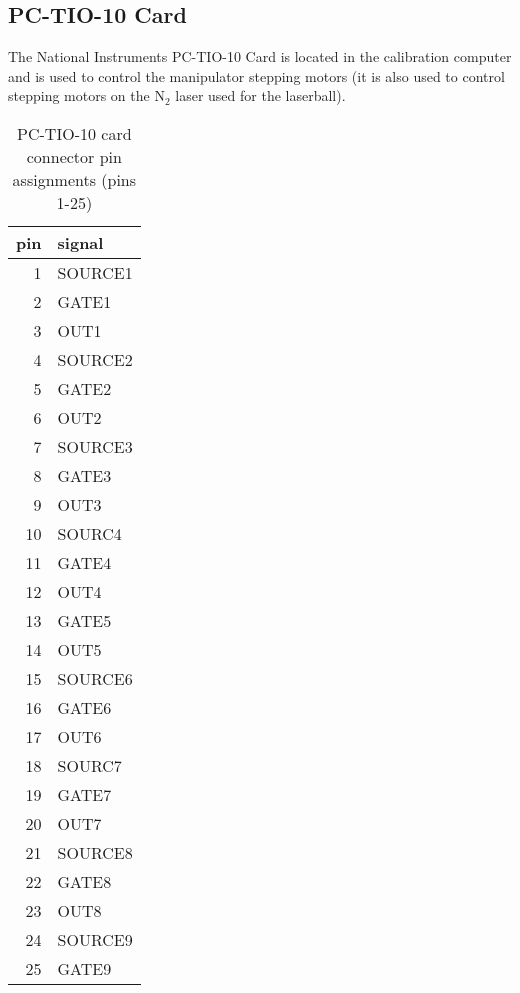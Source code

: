 \subsection{PC-TIO-10 Card}
The National Instruments PC-TIO-10 Card is located in the calibration 
computer and is used to control the manipulator stepping motors (it
is also used to control stepping motors on the N$_2$ laser used for the
laserball).
\begin{table}
\begin{center}
\begin{tabular}{|r|l|}
\hline
pin & signal\\ \hline
1  & SOURCE1\\
2  & GATE1  \\
3  & OUT1   \\
4  & SOURCE2\\
5  & GATE2  \\
6  & OUT2   \\
7  & SOURCE3\\
8  & GATE3  \\
9  & OUT3   \\
10 & SOURC4 \\
11 & GATE4  \\
12 & OUT4   \\
13 & GATE5  \\
14 & OUT5   \\
15 & SOURCE6\\  
16 & GATE6  \\
17 & OUT6   \\
18 & SOURC7 \\
19 & GATE7  \\ 
20 & OUT7   \\
21 & SOURCE8\\
22 & GATE8  \\
23 & OUT8   \\
24 & SOURCE9\\
25 & GATE9  \\
\hline
\end{tabular}
\caption[PC-TIO-10 card connector pin assignments (pins 1-25)]
        {PC-TIO-10 card connector pin assignments (pins 1-25)
        }
\end{center}
\end{table}
  
